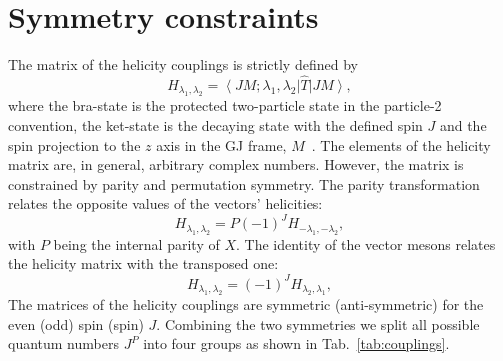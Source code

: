 \documentclass[prd,preprintnumbers,floatfix,
nofootinbib,superscriptaddress]{revtex4}
\newcommand{\ket}[1]{\ensuremath{\left|#1\right\rangle}}
\newcommand{\bra}[1]{\ensuremath{\left\langle #1\right|}}
\begin{document}
%


\section{Symmetry constraints} \label{sec:symmetries}
The matrix of the helicity couplings is strictly defined by
\begin{equation} \label{eq:helicity.def}
  H_{\lambda_1,\lambda_2} = \bra{JM;\lambda_1,\lambda_2}\hat{T}\ket{JM},
\end{equation}
where the bra-state is the protected two-particle state in the particle-2 convention,
the ket-state is the decaying state with the defined spin $J$ and the spin projection to the $z$ axis in the GJ frame, $M$~\cite{Martin:1970xx,Collins:1977jy}.
The elements of the helicity matrix are, in general, arbitrary complex numbers.
However, the matrix is constrained by parity and permutation symmetry.
The parity transformation relates the opposite values of the vectors' helicities:
\begin{equation} \label{eq:parity}
H_{\lambda_1,\lambda_2} = P (-1)^J H_{-\lambda_1,-\lambda_2},
\end{equation}
with $P$ being the internal parity of $X$.
The identity of the vector mesons relates the helicity matrix with the transposed one:
\begin{equation} \label{eq:permutation}
H_{\lambda_1,\lambda_2} = (-1)^J H_{\lambda_2,\lambda_1},
\end{equation}
The matrices of the helicity couplings are symmetric (anti-symmetric) for the even (odd) spin (spin) $J$.
Combining the two symmetries we split all possible quantum numbers $J^P$ into four groups as shown in Tab.~\ref{tab:couplings}.
\end{document}
